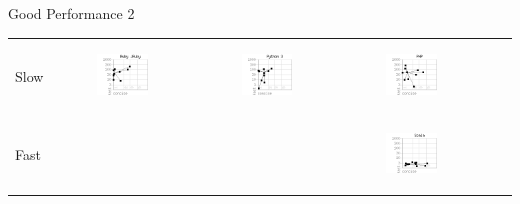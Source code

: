 \documentclass[t]{beamer}
\begin{document}
\begin{frame}{Good Performance 2}
  \begin{tabular}{lccccc}
     Slow
     &\begin{minipage}{0.625in}{\begin{figure}\includegraphics[scale=0.30]{jruby-CT.png}\end{figure}}\end{minipage}
     &\begin{minipage}{0.625in}{\begin{figure}\includegraphics[scale=0.30]{python-CT.png}\end{figure}}\end{minipage}
     & \begin{minipage}{0.625in}{\begin{figure}\includegraphics[scale=0.30]{php-CT.png}\end{figure}}\end{minipage}
     & &
\\
     Fast
     &&
     & \begin{minipage}{0.625in}{\begin{figure}\includegraphics[scale=0.30]{scala-CT.png}\end{figure}}\end{minipage}

\end{tabular}
\end{frame}
\end{document}
